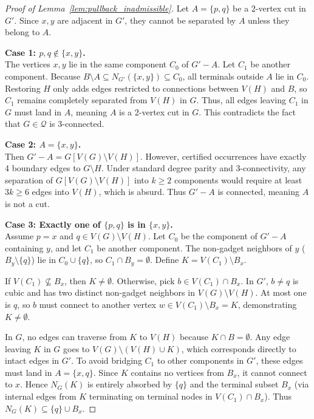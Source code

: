 \begin{proof}[Proof of Lemma~\ref{lem:pullback_inadmissible}]
Let $A=\{p,q\}$ be a 2-vertex cut in $G'$. Since $x,y$ are adjacent in $G'$, they cannot be separated by $A$ unless they belong to $A$.

\medskip\noindent\textbf{Case 1: $p,q \notin \{x,y\}$.}\\
The vertices $x,y$ lie in the same component $C_0$ of $G'-A$. Let $C_1$ be another component. Because $B \setminus A \subseteq N_{G'}(\{x,y\}) \subseteq C_0$, all terminals outside $A$ lie in $C_0$. Restoring $H$ only adds edges restricted to connections between $V(H)$ and $B$, so $C_1$ remains completely separated from $V(H)$ in $G$. Thus, all edges leaving $C_1$ in $G$ must land in $A$, meaning $A$ is a 2-vertex cut in $G$. This contradicts the fact that $G \in \mathcal{Q}$ is 3-connected.

\medskip\noindent\textbf{Case 2: $A = \{x,y\}$.}\\
Then $G'-A = G[V(G)\setminus V(H)]$. However, certified occurrences have exactly 4 boundary edges to $G \setminus H$. Under standard degree parity and 3-connectivity, any separation of $G[V(G)\setminus V(H)]$ into $k \ge 2$ components would require at least $3k \ge 6$ edges into $V(H)$, which is absurd. Thus $G'-A$ is connected, meaning $A$ is not a cut.

\medskip\noindent\textbf{Case 3: Exactly one of $\{p,q\}$ is in $\{x,y\}$.}\\
Assume $p=x$ and $q \in V(G)\setminus V(H)$. Let $C_0$ be the component of $G'-A$ containing $y$, and let $C_1$ be another component. The non-gadget neighbors of $y$ ($B_y \setminus \{q\}$) lie in $C_0 \cup \{q\}$, so $C_1 \cap B_y = \emptyset$. Define $K = V(C_1) \setminus B_x$. 

If $V(C_1) \nsubseteq B_x$, then $K \neq \emptyset$. Otherwise, pick $b \in V(C_1) \cap B_x$. In $G'$, $b \neq q$ is cubic and has two distinct non-gadget neighbors in $V(G) \setminus V(H)$. At most one is $q$, so $b$ must connect to another vertex $w \in V(C_1) \setminus B_x = K$, demonstrating $K \neq \emptyset$.

In $G$, no edges can traverse from $K$ to $V(H)$ because $K \cap B = \emptyset$. Any edge leaving $K$ in $G$ goes to $V(G) \setminus (V(H) \cup K)$, which corresponds directly to intact edges in $G'$. To avoid bridging $C_1$ to other components in $G'$, these edges must land in $A=\{x,q\}$. Since $K$ contains no vertices from $B_x$, it cannot connect to $x$. Hence $N_G(K)$ is entirely absorbed by $\{q\}$ and the terminal subset $B_x$ (via internal edges from $K$ terminating on terminal nodes in $V(C_1) \cap B_x$). Thus $N_G(K) \subseteq \{q\} \cup B_x$.
\end{proof}

